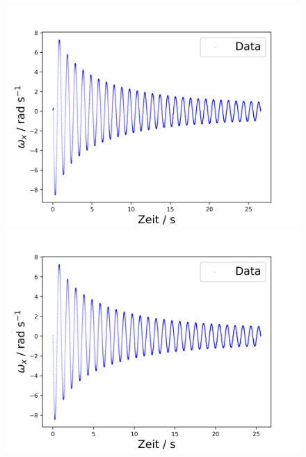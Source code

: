 \documentclass[11pt,ngerman]{scrartcl}
\begin{document}
\begin{figure}[H]
    \centering
    \begin{minipage}[htbp]{\linewidth}
        \begin{minipage}[htbp]{.32\linewidth} %
            \includegraphics[width=\linewidth]{pics/omega/fit_of_t_wx_mess_nr_7.png}
        \end{minipage}
        \begin{minipage}[htbp]{.32\linewidth} %
            \includegraphics[width=\linewidth]{pics/omega/fit_of_t_wx_mess_nr_8.png}
        \end{minipage}
        \begin{minipage}[htbp]{.32\linewidth} %

\end{minipage}
\end{minipage}
\end{figure}
\end{document}

